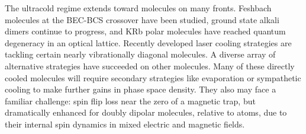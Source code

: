 \documentclass[%
 reprint,
 amsmath,amssymb,
 aps,
prl,
]{revtex4-1}
\newcommand{\s}{{\nobreak\hspace{.2em}}}
\begin{document}
The ultracold regime extends toward molecules on many fronts\s\cite{Carr2009}.
Feshbach molecules at the BEC-BCS crossover have been studied\s\cite{Greiner2003, Zwierlein2003, Jochim2003}, ground state alkali dimers continue to progress\s\cite{Ni2008, Danzl2010, Takekoshi2014, Molony2014, Park2015, Guo2016, Drews2017, Liu2017, Rvachov2017},
and KRb polar molecules have reached quantum degeneracy in an optical lattice\s\cite{Moses2015}.
Recently developed laser cooling strategies are tackling certain nearly vibrationally diagonal molecules\s\cite{Stuhl2008, Hummon2013, Barry2014, Zhelyazkova2014, Hemmerling2016, Truppe2017}.
A diverse array of alternative strategies have succeeded on other molecules\s\cite{Weinstein1998, Bethlem1999, Bochinski2003, Narevicius2008, Wiederkehr2012, Prehn2016, Liu2017a}.
Many of these directly cooled molecules will require secondary strategies like evaporation or sympathetic cooling to make further gains in phase space density\s\cite{Parazzoli2011, Stuhl2012evap, Quemener2016}.
They also may face a familiar challenge: spin flip loss near the zero of a magnetic trap, but dramatically enhanced for doubly dipolar molecules, relative to atoms, due to their internal spin dynamics in mixed electric and magnetic fields.
\end{document}
